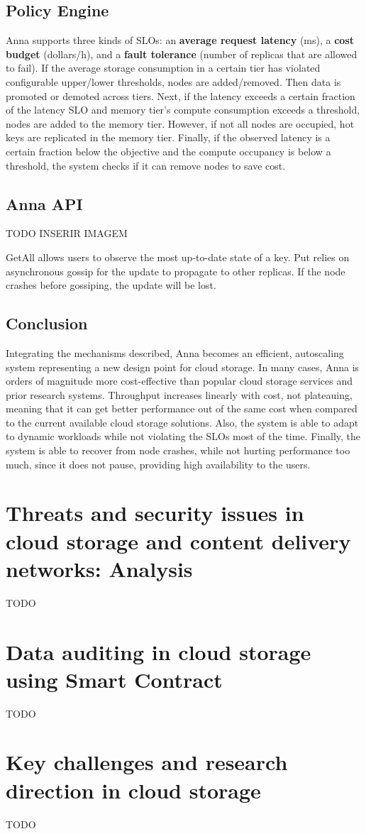 \documentclass[14pt,oneside]{extreport}
\newcommand*\fpar{\hspace{1ex}}
\begin{document}
  \section{Policy Engine}
  \fpar Anna supports three kinds of SLOs: an \textbf{average request latency} (ms), a \textbf{cost budget} (dollars/h), and a \textbf{fault tolerance} (number of replicas that are allowed to fail). If the average storage consumption in a certain tier has violated configurable upper/lower thresholds, nodes are added/removed. Then data is promoted or demoted across tiers. Next, if the latency exceeds a certain fraction of the latency SLO and memory tier’s compute consumption exceeds a threshold, nodes are added to the memory tier. However, if not all nodes are occupied, hot keys are replicated in the memory tier. Finally, if the observed latency is a certain fraction below the objective and the compute occupancy is below a threshold, the system checks if it can remove nodes to save cost.

  \section{Anna API}
  \fpar TODO INSERIR IMAGEM
  \par GetAll allows users to observe the most up-to-date state of a key. Put relies on asynchronous gossip for the update to propagate to other replicas. If the node crashes before gossiping, the update will be lost.

  \section{Conclusion}
  \fpar Integrating the mechanisms described, Anna becomes an efficient, autoscaling system representing a new design point for cloud storage. In many cases, Anna is orders of magnitude more cost-effective than popular cloud storage services and prior research systems. Throughput increases linearly with cost, not plateauing, meaning that it can get better performance out of the same cost when compared to the current available cloud storage solutions. Also, the system is able to adapt to dynamic workloads while not violating the SLOs most of the time. Finally, the system is able to recover from node crashes, while not hurting performance too much, since it does not pause, providing high availability to the users.

\chapter{Threats and security issues in cloud storage and content delivery networks: Analysis \cite{paper3}}
\fpar TODO

\chapter{Data auditing in cloud storage using Smart Contract \cite{paper4}}
\fpar TODO

\chapter{Key challenges and research direction in cloud storage \cite{paper5}}
\fpar TODO



\end{document}
